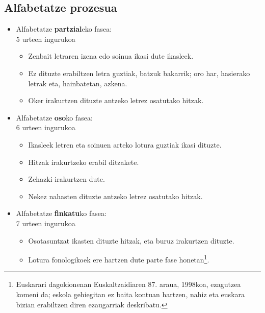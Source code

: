 \documentclass[
]{book}
\providecommand{\tightlist}{%
  \setlength{\itemsep}{0pt}\setlength{\parskip}{0pt}}
\begin{document}
\hypertarget{alfabetatze-prozesua}{%
\subsection{Alfabetatze prozesua}\label{alfabetatze-prozesua}}

\begin{itemize}
\tightlist
\item
  Alfabetatze \textbf{partzial}eko fasea:\\
  5 urteen ingurukoa

  \begin{itemize}
  \tightlist
  \item
    Zenbait letraren izena edo soinua ikasi dute ikasleek.
  \item
    Ez dituzte erabiltzen letra guztiak, batzuk bakarrik; oro har, hasierako letrak eta, hainbatetan, azkena.
  \item
    Oker irakurtzen dituzte antzeko letrez osatutako hitzak.
  \end{itemize}
\item
  Alfabetatze \textbf{oso}ko fasea:\\
  6 urteen ingurukoa

  \begin{itemize}
  \tightlist
  \item
    Ikasleek letren eta soinuen arteko lotura guztiak ikasi dituzte.
  \item
    Hitzak irakurtzeko erabil ditzakete.
  \item
    Zehazki irakurtzen dute.
  \item
    Nekez nahasten dituzte antzeko letrez osatutako hitzak.
  \end{itemize}
\item
  Alfabetatze \textbf{finkatu}ko fasea:\\
  7 urteen ingurukoa

  \begin{itemize}
  \tightlist
  \item
    Osotasuntzat ikasten dituzte hitzak, eta buruz irakurtzen dituzte.
  \item
    Lotura fonologikoek ere hartzen dute parte fase honetan\footnote{Euskarari dagokionenan Euskaltzaidiaren 87. araua, 1998koa, ezagutzea komeni da; eskola gehiegitan ez baita kontuan hartzen, nahiz eta euskara bizian erabiltzen diren ezaugarriak deskribatu.}.
  \end{itemize}
\end{itemize}
\end{document}
